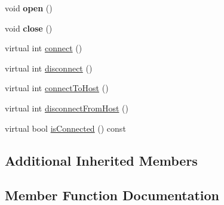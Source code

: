 \begin{DoxyCompactItemize}
\item 
\mbox{\label{classathome_1_1communication_1_1wifi_1_1_e_s_p8266_wi_fi_communicator_a333ff2e250a1ab2dfcf1712932858e16}} 
void {\bfseries open} ()
\item 
\mbox{\label{classathome_1_1communication_1_1wifi_1_1_e_s_p8266_wi_fi_communicator_af282a8ff0a6d06773ca953632d2c56f4}} 
void {\bfseries close} ()
\item 
virtual int \mbox{\hyperlink{classathome_1_1communication_1_1wifi_1_1_e_s_p8266_wi_fi_communicator_a58cc439be2f368b346bbbe1601a9b675}{connect}} ()
\item 
virtual int \mbox{\hyperlink{classathome_1_1communication_1_1wifi_1_1_e_s_p8266_wi_fi_communicator_a7e53e10b858aebc5e7c6c0ea6007f84a}{disconnect}} ()
\item 
virtual int \mbox{\hyperlink{classathome_1_1communication_1_1wifi_1_1_e_s_p8266_wi_fi_communicator_a159a93b350df135daa967665c9e53e2f}{connect\+To\+Host}} ()
\item 
virtual int \mbox{\hyperlink{classathome_1_1communication_1_1wifi_1_1_e_s_p8266_wi_fi_communicator_a0f8adbe1b1d219148c4f340980056356}{disconnect\+From\+Host}} ()
\item 
virtual bool \mbox{\hyperlink{classathome_1_1communication_1_1wifi_1_1_e_s_p8266_wi_fi_communicator_aefadac9b1a67d52853495dfabecad5fd}{is\+Connected}} () const
\end{DoxyCompactItemize}
\subsection*{Additional Inherited Members}


\subsection{Member Function Documentation}
\mbox{\label{classathome_1_1communication_1_1wifi_1_1_e_s_p8266_wi_fi_communicator_af9b1e28910959893748763faaa5373a0}} 
